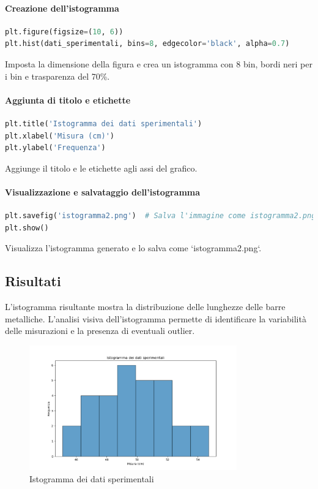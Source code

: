 \documentclass[a4paper,12pt]{article}
\begin{document}
\paragraph{Creazione dell'istogramma}
\begin{lstlisting}[language=Python, caption=Creazione dell'istogramma]
plt.figure(figsize=(10, 6))
plt.hist(dati_sperimentali, bins=8, edgecolor='black', alpha=0.7)
\end{lstlisting}
Imposta la dimensione della figura e crea un istogramma con 8 bin, bordi neri per i bin e trasparenza del 70\%.

\paragraph{Aggiunta di titolo e etichette}
\begin{lstlisting}[language=Python, caption=Aggiunta di titolo e etichette]
plt.title('Istogramma dei dati sperimentali')
plt.xlabel('Misura (cm)')
plt.ylabel('Frequenza')
\end{lstlisting}
Aggiunge il titolo e le etichette agli assi del grafico.

\paragraph{Visualizzazione e salvataggio dell'istogramma}
\begin{lstlisting}[language=Python, caption=Visualizzazione e salvataggio dell'istogramma]
plt.savefig('istogramma2.png')  # Salva l'immagine come istogramma2.png
plt.show()
\end{lstlisting}
Visualizza l'istogramma generato e lo salva come `istogramma2.png`.

\subsection{Risultati}
L'istogramma risultante mostra la distribuzione delle lunghezze delle barre metalliche. L'analisi visiva dell'istogramma permette di identificare la variabilità delle misurazioni e la presenza di eventuali outlier.

\begin{figure}[H]
    \centering
    \includegraphics[width=0.8\textwidth]{istogramma2.png}
    \caption{Istogramma dei dati sperimentali}
    \label{fig:istogramma}
\end{figure}
\end{document}
